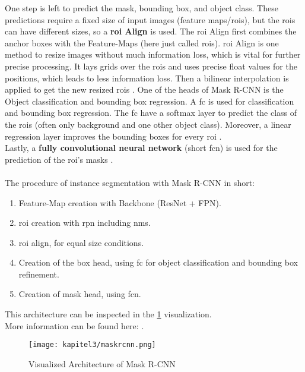 		One step is left to predict the mask, bounding box, and object class. These predictions require a fixed size of input images (feature maps/\ac{roi}s), but the \ac{roi}s can have different sizes, so a \textbf{\ac{roi} Align} is used. The \ac{roi} Align first combines the anchor boxes with the Feature-Maps (here just called \ac{roi}s). \ac{roi} Align is one method to resize images without much information loss, which is vital for further precise processing. It lays grids over the \ac{roi}s and uses precise float values for the positions, which leads to less information loss. Then a bilinear interpolation is applied to get the new resized \ac{roi}s \cite{Kaiming2017}.
		\clearpage
		One of the heads of Mask R-CNN is the {Object classification and bounding box regression}. A \ac{fc} is used for classification and bounding box regression. The \ac{fc} have a softmax layer to predict the class of the \ac{roi}s (often only background and one other object class). Moreover, a linear regression layer improves the bounding boxes for every \ac{roi} \cite{Ren2016}.\\
		Lastly, a \textbf{fully convolutional neural network} (short \ac{fcn}) is used for the prediction of the \ac{roi}'s masks \cite{Kang2014}.\\
		\\
		The procedure of instance segmentation with Mask R-CNN in short:
		\begin{enumerate}
			\item Feature-Map creation with Backbone (ResNet + FPN).
			\item \ac{roi} creation with \ac{rpn} including \ac{nms}.
			\item \ac{roi} align, for equal size conditions.
			\item Creation of the box head, using \ac{fc} for object classification and bounding box refinement.
			\item Creation of mask head, using \ac{fcn}.
		\end{enumerate}
		This architecture can be inspected in the \ref{img:maskrcnn} visualization.\\
		More information can be found here: \cite{Kaiming2017}\cite{Ramesh2021}. 
		
		\begin{figure}[h]
			\centering
			\texttt{[image: kapitel3/maskrcnn.png]}
			\caption[Visualized Architecture of Mask R-CNN by Tobia Ippolito]{Visualized Architecture of Mask R-CNN}
			\label{img:maskrcnn}
		\end{figure}
		
